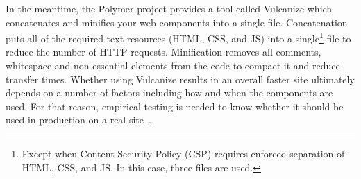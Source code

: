In the meantime, the Polymer project provides a tool called Vulcanize which concatenates and minifies your web components into a single file.
Concatenation puts all of the required text resources (HTML, CSS, and JS) into a 
single\footnote{Except when Content Security Policy (CSP) requires enforced separation of HTML, CSS, and JS. In this case, three files are used.}
file to reduce the number of HTTP requests.
Minification removes all comments, whitespace and non-essential elements from the code to compact it and reduce transfer times.
Whether using Vulcanize results in an overall faster site ultimately depends on a number of factors including how and when the components are used.
For that reason, empirical testing is needed to know whether it should be used in production on a real site~\cite{polymercontributors2015-a}.
